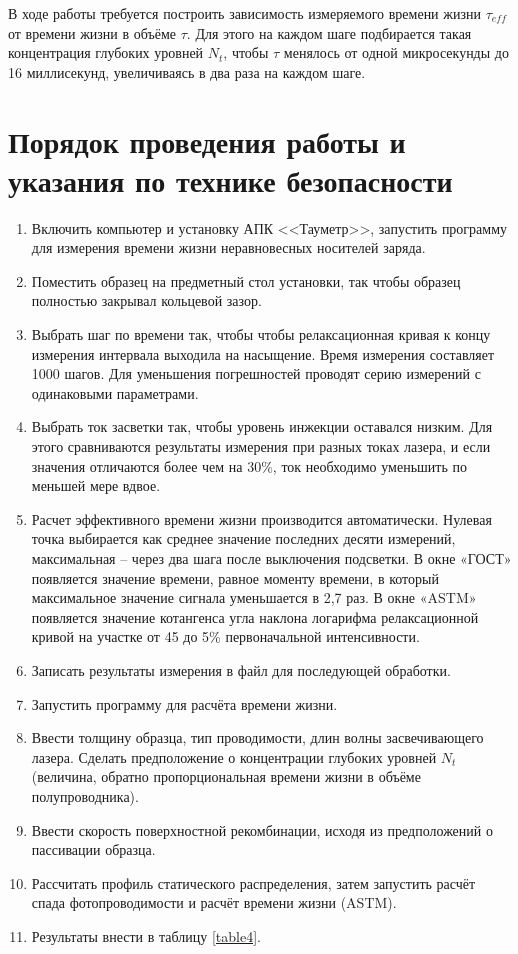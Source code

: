 В ходе работы требуется построить зависимость измеряемого времени жизни $\tau_{eff}$ от времени жизни в объёме $\tau$. Для этого на каждом шаге подбирается такая концентрация глубоких уровней $N_{t}$, чтобы $\tau$ менялось от одной микросекунды до 16 миллисекунд, увеличиваясь в два раза на каждом шаге.

\section{Порядок проведения работы и указания по технике безопасности}

\begin{enumerate}
\item Включить компьютер и установку АПК <<Тауметр>>, запустить программу для измерения времени жизни неравновесных носителей заряда.
\item Поместить образец на предметный стол установки, так чтобы образец полностью закрывал кольцевой зазор.
\item Выбрать шаг по времени так, чтобы чтобы релаксационная кривая к концу измерения интервала выходила на насыщение. Время измерения составляет 1000 шагов. Для уменьшения погрешностей проводят серию измерений с одинаковыми параметрами.
\item Выбрать ток засветки так, чтобы уровень инжекции оставался низким. Для этого сравниваются результаты измерения при разных токах лазера, и если значения отличаются более чем на 30\%, ток необходимо уменьшить по меньшей мере вдвое.
\item Расчет эффективного времени жизни производится автоматически. Нулевая точка выбирается как среднее значение последних десяти измерений, максимальная – через два шага после выключения подсветки. В окне «ГОСТ» появляется значение времени, равное моменту времени, в который максимальное значение сигнала уменьшается в 2,7 раз. В окне «ASTM» появляется значение котангенса угла наклона логарифма релаксационной кривой на участке от 45 до 5\% первоначальной интенсивности.
\item Записать результаты измерения в файл для последующей обработки.
\item Запустить программу для расчёта времени жизни.
\item Ввести толщину образца, тип проводимости, длин волны засвечивающего лазера. Сделать предположение о концентрации глубоких уровней $N_{t}$ (величина, обратно пропорциональная времени жизни в объёме полупроводника).
\item Ввести скорость поверхностной рекомбинации, исходя из предположений о пассивации образца.
\item Рассчитать профиль статического распределения, затем запустить расчёт спада фотопроводимости и расчёт времени жизни (ASTM).
\item Результаты внести в таблицу \ref{table4}.
\end{enumerate}


